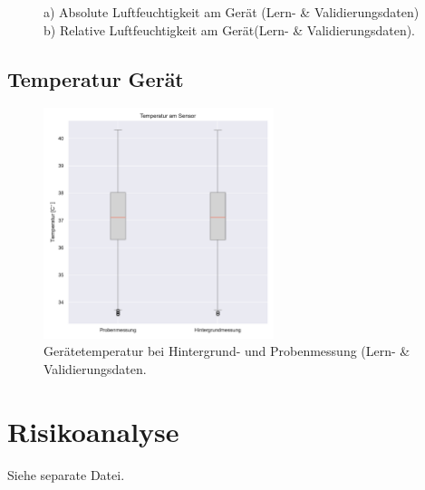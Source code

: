\documentclass[11pt, a4paper]{article}
\begin{document}
\begin{figure}[h!]
\begin{subfigure}[c]{0.49\textwidth}
        \caption{}
    \end{subfigure}
    \caption{a) Absolute Luftfeuchtigkeit am Gerät (Lern- \& Validierungsdaten) b) Relative Luftfeuchtigkeit am Gerät(Lern- \& Validierungsdaten).}
\end{figure}

\subsection{Temperatur Gerät}

\begin{figure}[h!]
	\centering
	\includegraphics[width=0.6\textwidth]{Figures/temp_plot}
	\caption{Gerätetemperatur bei Hintergrund- und Probenmessung (Lern- \& Validierungsdaten.}
\end{figure}

\section{Risikoanalyse}
\label{append:Risikoanalyse}
Siehe separate Datei.
\end{document}
